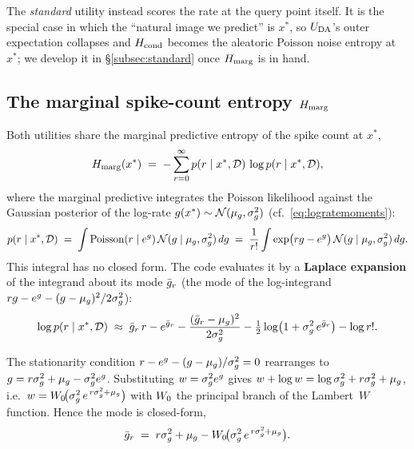 The \emph{standard} utility instead scores the rate at the query point itself. It
is the special case in which the ``natural image we predict'' is $x^{*}$, so
$U_{\mathrm{DA}}$'s outer expectation collapses and $H_{\mathrm{cond}}$ becomes the aleatoric Poisson
noise entropy at $x^{*}$; we develop it in \S\ref{subsec:standard} once $H_{\mathrm{marg}}$
is in hand.

\subsection{The marginal spike-count entropy \texorpdfstring{$H_{\mathrm{marg}}$}{H\_marg}}
\label{subsec:hmarg}

Both utilities share the marginal predictive entropy of the spike count at
$x^{*}$,
%
\begin{equation}
  H_{\mathrm{marg}}(x^{*})
  \;=\; -\sum_{r=0}^{\infty} p(r\mid x^{*},\mathcal D)\,\log p(r\mid x^{*},\mathcal D),
  \label{eq:Hmarg}
\end{equation}
%
where the marginal predictive integrates the Poisson likelihood against the
Gaussian posterior of the log-rate $g(x^{*})\sim\mathcal{N}(\mu_{g},\sigma_{g}^{2})$
(cf.~\eqref{eq:logratemoments}):
%
\begin{equation}
  p(r\mid x^{*},\mathcal D)
  \;=\; \int \mathrm{Poisson}(r\mid e^{g})\,\mathcal{N}(g\mid\mu_{g},\sigma_{g}^{2})\,dg
  \;=\; \frac{1}{r!}\int \exp\!\big(rg - e^{g}\big)\,\mathcal{N}(g\mid\mu_{g},\sigma_{g}^{2})\,dg .
  \label{eq:marg-predictive}
\end{equation}
%
This integral has no closed form. The code evaluates it by a \textbf{Laplace
expansion} of the integrand about its mode $\bar{g}_{r}$ (the mode of the
log-integrand $rg - e^{g} - (g-\mu_{g})^{2}/2\sigma_{g}^{2}$):
%
\begin{equation}
  \log p(r\mid x^{*},\mathcal D)
  \;\approx\;
  \bar{g}_{r}\,r - e^{\bar{g}_{r}}
  - \frac{(\bar{g}_{r}-\mu_{g})^{2}}{2\sigma_{g}^{2}}
  - \tfrac12\log\!\big(1+\sigma_{g}^{2}\,e^{\bar{g}_{r}}\big)
  - \log r! .
  \label{eq:laplace-logp}
\end{equation}

\begin{lemma}\label{lem:mode}
The stationarity condition $r-e^{g}-(g-\mu_{g})/\sigma_{g}^{2}=0$ rearranges to
$g=r\sigma_{g}^{2}+\mu_{g}-\sigma_{g}^{2} e^{g}$. Substituting $w=\sigma_{g}^{2} e^{g}$ gives
$w+\log w=\log\sigma_{g}^{2}+r\sigma_{g}^{2}+\mu_{g}$, i.e.\ $w=W_{0}\!\big(\sigma_{g}^{2}\,e^{\,r\sigma_{g}^{2}+\mu_{g}}\big)$
with $W_{0}$ the principal branch of the Lambert~$W$ function. Hence the mode is
closed-form,
%
\begin{equation}
  \bar{g}_{r} \;=\; r\sigma_{g}^{2}+\mu_{g}-W_{0}\!\big(\sigma_{g}^{2}\,e^{\,r\sigma_{g}^{2}+\mu_{g}}\big).
  \label{eq:laplace-mode}
\end{equation}
\end{lemma}

